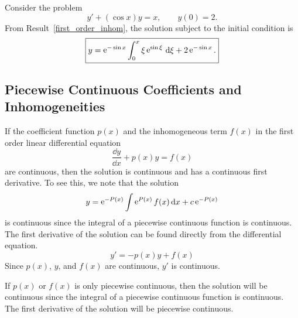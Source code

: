 \begin{Example}
  Consider the problem
  \[ 
  y' + (\cos x) y = x, \qquad y(0) = 2.
  \]
  From Result~\ref{first_order_inhom}, the solution subject to the initial 
  condition is
  \[ 
  \boxed{
    y = \mathop{\mathrm{e}}\nolimits^{-\sin x} \int^x_0 \xi \mathop{\mathrm{e}}\nolimits^{\sin \xi}\,\mathrm{d} \xi + 2 \mathop{\mathrm{e}}\nolimits^{-\sin x}.
    }
  \]
\end{Example}









\subsection{Piecewise Continuous Coefficients and Inhomogeneities}


If the coefficient function $p(x)$ and the inhomogeneous term $f(x)$ in
the first order linear differential equation
\[ 
\frac{\dd y}{\dd x} + p(x) y = f(x) 
\]
are continuous, then the solution is continuous and has a continuous first 
derivative.   To see this, we note that the solution 
\[ 
y = \mathop{\mathrm{e}}\nolimits^{-P(x)}\int \mathop{\mathrm{e}}\nolimits^{P(x)}f(x)\,\mathrm{d} x + c \mathop{\mathrm{e}}\nolimits^{-P(x)}
\]
is continuous since the integral of a piecewise continuous function is
continuous.  The first derivative of the solution can be found directly
from the differential equation.
\[ 
y' = - p(x) y + f(x)
\]
Since $p(x)$, $y$, and $f(x)$ are continuous, $y'$ is continuous.

If $p(x)$ or $f(x)$ is only piecewise continuous, then the solution will be
continuous since the integral of a piecewise continuous function is continuous.
The first derivative of the solution will be piecewise continuous.






